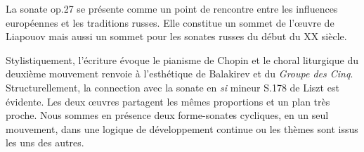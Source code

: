 La sonate op.27 se présente comme un point de rencontre entre les influences européennes et les traditions russes. Elle constitue un sommet de l'œuvre de Liapouov mais aussi un sommet pour les sonates russes du début du XX\ieme{} siècle.

Stylistiquement, l'écriture évoque le pianisme de Chopin et le choral liturgique du deuxième mouvement renvoie à l'esthétique de Balakirev et du \emph{Groupe des Cinq}. Structurellement, la connection avec la sonate en \emph{si} mineur S.178 de Liszt est évidente. Les deux œuvres partagent les mêmes proportions et un plan très proche. Nous sommes en présence deux forme-sonates cycliques, en un seul mouvement, dans une logique de développement continue ou les thèmes sont issus les uns des autres.

